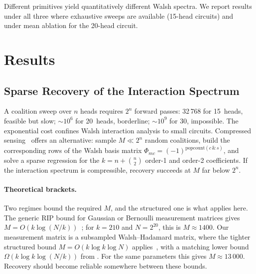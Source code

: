 \documentclass{article}
\begin{document}
Different primitives yield quantitatively different Walsh spectra. We
report results under all three where exhaustive sweeps are available
(15-head circuits) and under mean ablation for the 20-head circuit.



\section{Results}
\label{sec:results}


%
%

\subsection{Sparse Recovery of the Interaction Spectrum}
\label{sec:sparse-walsh-recovery}

A coalition sweep over $n$ heads requires $2^n$ forward passes: 32\,768
for 15~heads, feasible but slow; ${\sim}10^6$ for 20~heads, borderline;
${\sim}10^9$ for 30, impossible. The exponential cost confines Walsh
interaction analysis to small circuits.  Compressed
sensing~\citep{candes2005decoding} offers an alternative: sample $M \ll 2^n$
random coalitions, build the corresponding rows of the Walsh basis matrix
$\Phi_{mc} = (-1)^{\mathrm{popcount}(c \,\&\, s)}$, and solve a sparse
regression for the $k = n + \binom{n}{2}$ order-1 and order-2 coefficients.
If the interaction spectrum is compressible, recovery succeeds at $M$
far below $2^n$.

\paragraph{Theoretical brackets.}

Two regimes bound the required $M$, and the structured one is what applies here. The generic RIP bound for Gaussian or Bernoulli measurement matrices gives
$M = O(k \log(N/k))$~\citep{candes2005decoding}; for $k=210$ and
$N = 2^{20}$, this is $M \approx 1400$. Our measurement matrix is a
subsampled Walsh--Hadamard matrix, where the tighter structured bound
$M = O(k \log k \log N)$ applies~\citep{bourgain2014,rudelson2008sparse},
with a matching lower bound $\Omega(k \log k \log(N/k))$ from
\citet{blasiok2019sparse}. For the same parameters this gives $M \approx 13\,000$.
Recovery should become reliable somewhere between these bounds.
\end{document}
